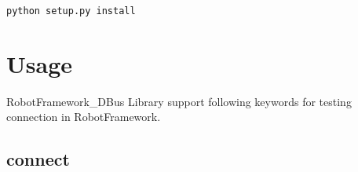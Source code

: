 \begin{verbatim}
python setup.py install
\end{verbatim}

\hypertarget{usage}{%
\section{Usage}\label{description-usage}}

RobotFramework\_DBus Library support following keywords for testing connection in RobotFramework.

\hypertarget{description-connect}{%
\subsection{\texorpdfstring{\textbf{connect}}{connect}}\label{description-connect}}

